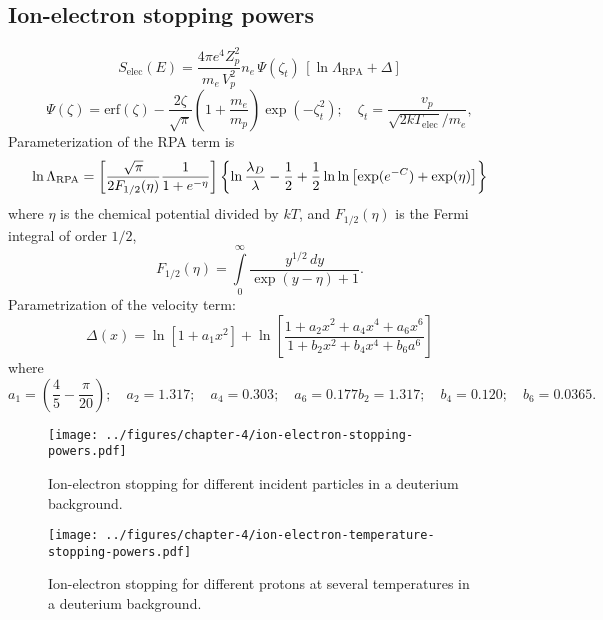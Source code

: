 \subsection{Ion-electron stopping powers}
\begin{equation}
  S_{\text{elec}}(E) = \dfrac{4 \pi e^4 Z_p^2}{m_e \, V_p^2} n_e \, \Psi(\zeta_t) \, \left[\ln \Lambda_{\text{RPA}} + \Delta \right]
\end{equation}
\begin{equation}
  \Psi(\zeta) = \text{erf}(\zeta) - \dfrac{2 \zeta}{\sqrt{\pi}}\left(1 + \dfrac{m_e}{m_p} \right) \exp\left(-\zeta_t^2\right); \quad \zeta_t = \dfrac{v_p}{\sqrt{2 kT_{\text{elec}}}/m_e},
\end{equation}
Parameterization of the RPA term is
\begin{equation}
  \ln \Lambda_{\text{RPA}} = \left[ \dfrac{\sqrt{\pi} }{2 F_{1/2}(\eta)} \dfrac{1}{1 + e^{\tiny{-\eta}}} \right] \left\lbrace \ln \dfrac{\lambda_D}{\lambda} - \dfrac{1}{2} + \dfrac{1}{2} \ln\ln \left[ \exp(e^{-C}) + \exp(\eta) \right] \right\rbrace
\end{equation}
where $\eta$ is the chemical potential divided by $kT$, and $F_{1/2}(\eta)$ is the Fermi integral of order $1/2$,
\begin{equation}
  F_{1/2}(\eta) = \int\limits_{0}^{\infty} \dfrac{y^{1/2} \, dy}{\exp(y - \eta) + 1}.
\end{equation}
Parametrization of the velocity term:
\begin{equation}
  \Delta(x) = \ln\left[1 + a_1 x^2\right] + \ln \left[\dfrac{1 + a_2 x^2 + a_4 x^4 + a_6 x^6}{1 + b_2 x^2 + b_4 x^4 + b_6 a^6}\right]
\end{equation}
where
\begin{subequations}
  \begin{equation}
    a_1 = \left(\dfrac{4}{5} - \dfrac{\pi}{20}\right); \quad a_2 = 1.317; \quad a_4 = 0.303; \quad a_6 = 0.177
  \end{equation}
  \begin{equation}
    b_2 = 1.317; \quad b_4 = 0.120; \quad b_6 = 0.0365.
  \end{equation}
\end{subequations}

\begin{figure}[!htb]
  \centering
  \begin{minipage}[b]{0.45\textwidth}
    \texttt{[image: ../figures/chapter-4/ion-electron-stopping-powers.pdf]}
    \caption{Ion-electron stopping for different incident particles in a deuterium background.}
  \end{minipage}
  \hfill
  \begin{minipage}[b]{0.45\textwidth}
    \texttt{[image: ../figures/chapter-4/ion-electron-temperature-stopping-powers.pdf]}
    \caption{Ion-electron stopping for different protons at several temperatures in a deuterium background.}
  \end{minipage}
\end{figure}